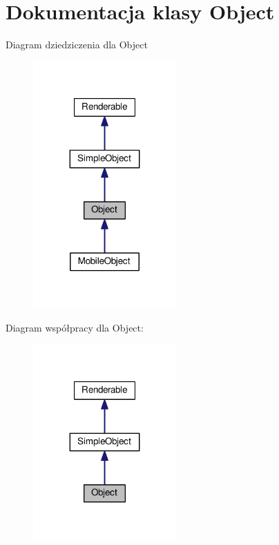 \hypertarget{class_object}{}\section{Dokumentacja klasy Object}
\label{class_object}


Diagram dziedziczenia dla Object
\nopagebreak
\begin{figure}[H]
\begin{center}
\leavevmode
\includegraphics[width=155pt]{class_object__inherit__graph}
\end{center}
\end{figure}


Diagram współpracy dla Object\+:
\nopagebreak
\begin{figure}[H]
\begin{center}
\leavevmode
\includegraphics[width=155pt]{class_object__coll__graph}
\end{center}
\end{figure}
